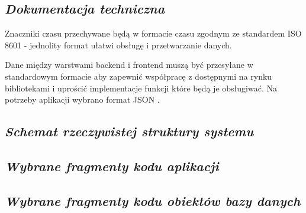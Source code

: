 \documentclass[a4paper,10pt, twoside]{report}
\newcommand{\customstylechapter}[1]{\large{\textit{#1}}}
\newcommand{\customstylesection}[1]{\textbf{\textit{#1}}}
\begin{document}
\begin{large}
\chapter{\customstylechapter{Dokumentacja techniczna}}
{Znaczniki czasu przechywane będą w formacie czasu zgodnym ze standardem 
ISO 8601 \cite{ISO 8601} - jednolity format ułatwi obsługę i przetwarzanie 
danych.}

{Dane między warstwami backend i frontend muszą być przesyłane w standardowym 
formacie aby zapewnić współpracę z dostępnymi na rynku bibliotekami i uprościć 
implementacje funkcji które będą je obsługiwać. Na potrzeby aplikacji wybrano 
format JSON \cite{JSON}.}


\section{\customstylesection{Schemat rzeczywistej struktury systemu}}
{}

\section{\customstylesection{Wybrane fragmenty kodu aplikacji}}
{}

\section{\customstylesection{Wybrane fragmenty kodu obiektów bazy danych}}
{}


\end{large}
\end{document}

